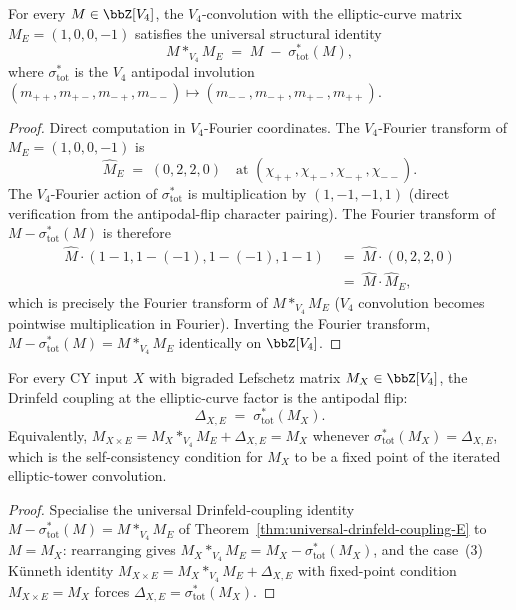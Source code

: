 \begin{theorem}
\label{thm:universal-drinfeld-coupling-E}
\ClaimStatusProvedHere
For every $M \in \bbZ[V_4]$, the $V_4$-convolution with the elliptic-curve
matrix $M_E = (1, 0, 0, -1)$ satisfies the universal structural identity
\[
 \boxed{\;M *_{V_4} M_E \;=\; M \;-\; \sigma_{\mathrm{tot}}^*(M),\;}
\]
where $\sigma_{\mathrm{tot}}^*$ is the $V_4$ antipodal involution
$(m_{++}, m_{+-}, m_{-+}, m_{--}) \mapsto (m_{--}, m_{-+}, m_{+-}, m_{++})$.
\end{theorem}

\begin{proof}
Direct computation in $V_4$-Fourier coordinates. The $V_4$-Fourier
transform of $M_E = (1, 0, 0, -1)$ is
\[
 \hat M_E \;=\; (0, 2, 2, 0) \quad \text{at } (\chi_{++}, \chi_{+-}, \chi_{-+}, \chi_{--}).
\]
The $V_4$-Fourier action of $\sigma_{\mathrm{tot}}^*$ is multiplication by
$(1, -1, -1, 1)$ \textup{(}direct verification from the antipodal-flip
character pairing\textup{).} The Fourier transform of
$M - \sigma_{\mathrm{tot}}^*(M)$ is therefore
\begin{align*}
 \hat M \cdot (1 - 1, 1 - (-1), 1 - (-1), 1 - 1)
 &\;=\; \hat M \cdot (0, 2, 2, 0) \\
 &\;=\; \hat M \cdot \hat M_E,
\end{align*}
which is precisely the Fourier transform of $M *_{V_4} M_E$ \textup{(}$V_4$
convolution becomes pointwise multiplication in Fourier\textup{).}
Inverting the Fourier transform, $M - \sigma_{\mathrm{tot}}^*(M) = M *_{V_4} M_E$
identically on $\bbZ[V_4]$.
\end{proof}

\begin{corollary}
\label{cor:universal-drinfeld-coupling-E}
For every CY input $X$ with bigraded Lefschetz matrix $M_X \in \bbZ[V_4]$,
the Drinfeld coupling at the elliptic-curve factor is the antipodal flip:
\[
 \Delta_{X, E} \;=\; \sigma_{\mathrm{tot}}^*(M_X).
\]
Equivalently, $M_{X \times E} = M_X *_{V_4} M_E + \Delta_{X, E} = M_X$
whenever $\sigma_{\mathrm{tot}}^*(M_X) = \Delta_{X, E}$, which is the
self-consistency condition for $M_X$ to be a fixed point of the iterated
elliptic-tower convolution.
\end{corollary}

\begin{proof}
Specialise the universal Drinfeld-coupling identity
$M - \sigma_{\mathrm{tot}}^*(M) = M *_{V_4} M_E$ of
Theorem~\ref{thm:universal-drinfeld-coupling-E} to $M = M_X$: rearranging
gives $M_X *_{V_4} M_E = M_X - \sigma_{\mathrm{tot}}^*(M_X)$, and the
case~(3) Künneth identity $M_{X \times E} = M_X *_{V_4} M_E + \Delta_{X, E}$
with fixed-point condition $M_{X \times E} = M_X$ forces
$\Delta_{X, E} = \sigma_{\mathrm{tot}}^*(M_X)$.
\end{proof}

